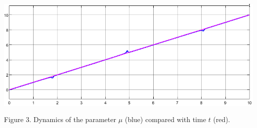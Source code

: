 \documentclass[11pt,american]{article}
\begin{document}
\begin{center}
\ifpdf %
  \includegraphics[width=1\textwidth]{toy_mu.png}
\fi

Figure 3. Dynamics of the parameter $\mu$ (blue) compared with time $t$ (red).
\end{center}
\end{document}
